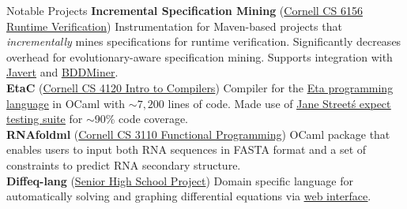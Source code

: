  
\begin{rSection}{Notable Projects}
	\textbf{Incremental Specification Mining} (\href{https://github.com/cyankaet/spec-miners}{Cornell CS 6156 Runtime Verification\ExternalLink}) Instrumentation for Maven-based projects that \textit{incrementally} mines specifications for runtime verification. Significantly decreases overhead for evolutionary-aware specification mining. Supports integration with \href{https://github.com/cyankaet/spec-miners/blob/master/miners/javert.sh}{\underline{Javert}} and \href{https://github.com/cyankaet/spec-miners/blob/master/miners/bddminer.sh}{\underline{BDDMiner}}.
	\\
	\textbf{EtaC} (\href{http://www.cs.cornell.edu/courses/cs4120/2023sp/}{Cornell CS 4120 Intro to Compilers\ExternalLink}) Compiler for the \href{https://www.cs.cornell.edu/courses/cs4120/2023sp/project/language.pdf}{\underline{Eta programming language}} in OCaml with $\sim 7,200$ lines of code. Made use of \href{https://blog.janestreet.com/the-joy-of-expect-tests/}{\underline{Jane Street\'s expect testing suite}} for $\sim$90\% code coverage.
	\\
	\textbf{RNAfoldml} (\href{https://github.com/jpVinnie/RNAfoldml/}{Cornell CS 3110 Functional Programming\ExternalLink}) OCaml package that enables users to input both RNA sequences in FASTA format and a set of constraints to predict RNA secondary structure.
	\\
	\textbf{Diffeq-lang} (\href{https://github.com/jpVinnie/diffeq-lang/}{Senior High School Project\ExternalLink}) Domain specific language for automatically solving and graphing differential equations via \href{https://jpramos.me/diffeq-lang/web/}{\underline{web interface}}.
\end{rSection}